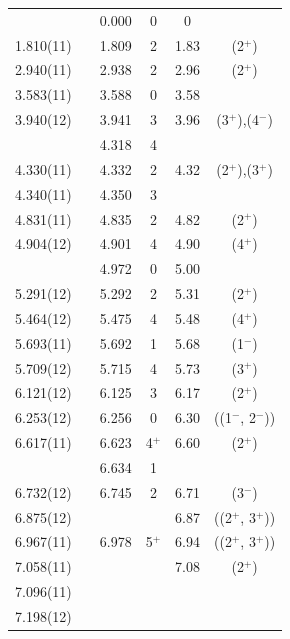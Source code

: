 {\begin{center}
\begin{longtable}{cc cc cc}
    \midrule
    \endhead
    \endfoot %
  \bottomrule

\endlastfoot

  &   & 0.000 & 0 & 0 &   \\
1.810(11)   &   & 1.809 & 2 & 1.83  & (2$^+$)                 \\
2.940(11)   &   & 2.938 & 2 & 2.96  & (2$^+$)                 \\
3.583(11)   &   & 3.588 & 0 & 3.58  &                         \\
3.940(12)   &   & 3.941 & 3 & 3.96  & (3$^+$),(4$^-$)         \\
  &   & 4.318 & 4 &   &   \\
4.330(11)   &   & 4.332 & 2 & 4.32  & (2$^+$),(3$^+$)         \\
4.340(11)   &   & 4.350 & 3 &   &                         \\
4.831(11)   &   & 4.835 & 2 & 4.82  & (2$^+$)                 \\
4.904(12)   &   & 4.901 & 4 & 4.90  & (4$^+$)                 \\
  &   & 4.972 & 0 & 5.00  &                         \\
5.291(12)   &   & 5.292 & 2 & 5.31  & (2$^+$)                 \\
5.464(12)   &   & 5.475 & 4 & 5.48  & (4$^+$)                 \\
5.693(11)   &   & 5.692 & 1 & 5.68  & (1$^-$)                 \\
5.709(12)   &   & 5.715 & 4 & 5.73  & (3$^+$)                 \\
6.121(12)   &   & 6.125 & 3 & 6.17  & (2$^+$)                 \\
6.253(12)   &   & 6.256 & 0 & 6.30  & ((1$^-$, 2$^-$))        \\
6.617(11)   &   & 6.623 & 4$^+$ & 6.60  & (2$^+$)                 \\
  &   & 6.634 & 1 &   &   \\
6.732(12)   &   & 6.745 & 2 & 6.71  & (3$^-$)                 \\
6.875(12)   &   &   &   & 6.87  & ((2$^+$, 3$^+$))        \\
6.967(11)   &   & 6.978 & 5$^+$   & 6.94  & ((2$^+$, 3$^+$))        \\
7.058(11)   &   &   &   & 7.08  & (2$^+$)                 \\
7.096(11)   &   &   &   &   &   \\
7.198(12)   &   &   &   &   &   \\

\end{longtable}
\end{center}}
